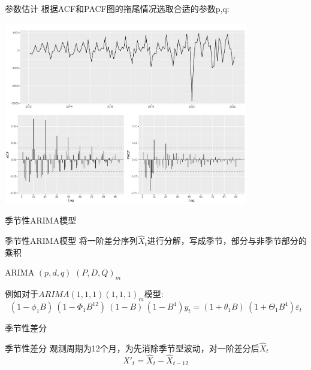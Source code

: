 \documentclass[10pt]{beamer}
\begin{document}
\begin{frame}{参数估计}
  根据ACF和PACF图的拖尾情况选取合适的参数p,q:
  \begin{center}
    \includegraphics[width=0.8\textwidth]{figures/acf_pacf.pdf}
  \end{center}   
\end{frame}
\begin{frame}{季节性ARIMA模型}
  \begin{block}{季节性ARIMA模型}
    将一阶差分序列\(\hat{X}_t\)进行分解，写成季节，部分与非季节部分的乘积

    \begin{center}
      ARIMA\;\;\;\;	\((p, d, q)\)	\;\;\;\;\; \((P, D, Q)_{m}\) \label{Season_decompose}
    \end{center}
    
    例如对于\(ARIMA(1,1,1)(1,1,1)_m\)模型:
    \[(1 - \phi_{1}B)~(1 - \Phi_{1}B^{12})~(1 - B)~(1 - B^{4})y_{t} = (1 + \theta_{1}B)~ (1 + \Theta_{1}B^{4})\varepsilon_{t}\]
  \end{block}
\end{frame}

\begin{frame}{季节性差分}
  \begin{block}{季节性差分}
    观测周期为12个月，为先消除季节型波动，对一阶差分后\(\hat{X}_t\)
    \[X'_{t} = \hat{X}_t-\hat{X}_{t-12}\]
  \end{block}
\end{frame}
\end{document}
